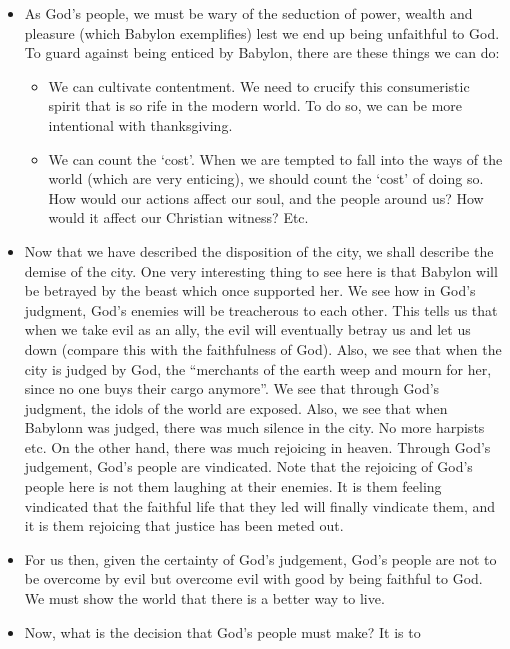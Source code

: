 \begin{itemize}
{  is bent on opposing God and instigating ungodliness and enticing God's
  people to idolatry.  }
  \item{As God's people, we must be wary of the seduction of power, wealth
  and pleasure (which Babylon exemplifies) lest we end up being unfaithful to
  God.  To guard against being enticed by Babylon, there are these things we
  can do:
  \begin{itemize}
    \item{We can cultivate contentment.  We need to crucify this
    consumeristic spirit that is so rife in the modern world.  To do so, we
    can be more intentional with thanksgiving.}
    \item{We can count the `cost'.  When we are tempted to fall into the ways
    of the world (which are very enticing), we should count the `cost' of
    doing so.  How would our actions affect our soul, and the people around
    us?  How would it affect our Christian witness?  Etc.  }
  \end{itemize}}
  \item{Now that we have described the disposition of the city, we shall
  describe the demise of the city.  One very interesting thing to see here is
  that Babylon will be betrayed by the beast which once supported her.  We
  see how in God's judgment, God's enemies will be treacherous to each other.
  This tells us that when we take evil as an ally, the evil will eventually
  betray us and let us down (compare this with the faithfulness of God).
  Also, we see that when the city is judged by God, the ``merchants of the
  earth weep and mourn for her, since no one buys their cargo anymore''.  We
  see that through God's judgment, the idols of the world are exposed.  Also,
  we see that when Babylonn was judged, there was much silence in the city.
  No more harpists etc.  On the other hand, there was much rejoicing in
  heaven.  Through God's judgement, God's people are vindicated.  Note that
  the rejoicing of God's people here is not them laughing at their enemies.
  It is them feeling vindicated that the faithful life that they led will
  finally vindicate them, and it is them rejoicing that justice has been
  meted out. }
  \item{For us then, given the certainty of God's judgement, God's people are
  not to be overcome by evil but overcome evil with good by being faithful to
  God.  We must show the world that there is a better way to live.}
  \item{Now, what is the decision that God's people must make?  It is to
}
\end{itemize}
